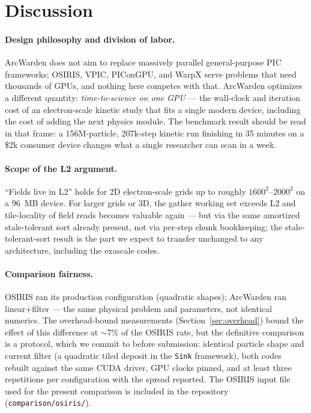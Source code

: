 \documentclass[11pt]{article}
\newcommand{\arcw}{ArcWarden}
\begin{document}
\section{Discussion}
\label{sec:discussion}

\paragraph{Design philosophy and division of labor.}
\arcw{} does not aim to replace massively parallel general-purpose PIC
frameworks; OSIRIS, VPIC, PIConGPU, and WarpX serve problems that need
thousands of GPUs, and nothing here competes with that. \arcw{}
optimizes a different quantity: \emph{time-to-science on one GPU} ---
the wall-clock and iteration cost of an electron-scale kinetic study
that fits a single modern device, including the cost of adding the next
physics module. The benchmark result should be read in that frame: a
156M-particle, 207k-step kinetic run finishing in 35 minutes on a
\$2k consumer device changes what a single researcher can scan in a
week.

\paragraph{Scope of the L2 argument.}
``Fields live in L2'' holds for 2D electron-scale grids up to roughly
$1600^2$--$2000^2$ on a \SI{96}{MB} device. For larger grids or 3D, the
gather working set exceeds L2 and tile-locality of field reads becomes
valuable again --- but via the same amortized stale-tolerant sort
already present, not via per-step chunk bookkeeping; the
stale-tolerant-sort result is the part we expect to transfer unchanged
to any architecture, including the exascale codes.

\paragraph{Comparison fairness.}
OSIRIS ran its production configuration (quadratic shapes); \arcw{} ran
linear+filter --- the same physical problem and parameters, not
identical numerics. The overhead-bound measurements
(Section~\ref{sec:overhead}) bound the effect of this difference at
$\sim$7\% of the OSIRIS rate, but the definitive comparison is a
protocol, which we commit to before submission: identical particle
shape and current filter (a quadratic tiled deposit in the
\texttt{Sink} framework), both codes rebuilt against the same CUDA
driver, GPU clocks pinned, and at least three repetitions per
configuration with the spread reported. The OSIRIS input file used for
the present comparison is included in the repository
(\texttt{comparison/osiris/}).
\end{document}
